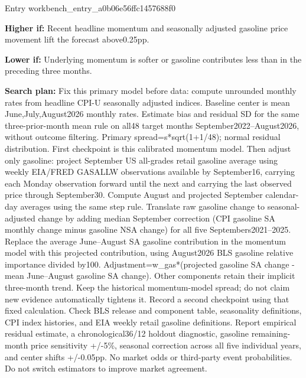 \documentclass[11pt]{article}
\begin{document}
Entry workbench\_en\hspace{0pt}try\_a0b06e56\hspace{0pt}ffc1457688f0


\par\noindent\textbf{Higher if:} Recent headline momentum and seasonally adjusted gasoline price movement lift the forecast above0.25pp.

\par\noindent\textbf{Lower if:} Underlying momentum is softer or gasoline contributes less than in the preceding three months.

\par\noindent\textbf{Search plan:} Fix this primary model before data: compute unrounded monthly rates from headline CPI-U seasonally adjusted indices. Baseline center is mean June,July,August2026 monthly rates. Estimate bias and residual SD for the same three-prior-month mean rule on all48 target months September2022–August2026, without outcome filtering. Primary spread=s*sqrt(1+1/48); normal residual distribution. First checkpoint is this calibrated momentum model. Then adjust only gasoline: project September US all-grades retail gasoline average using weekly EIA/FRED GASALLW observations available by September16, carrying each Monday observation forward until the next and carrying the last observed price through September30. Compute August and projected September calendar-day averages using the same step rule. Translate raw gasoline change to seasonal-adjusted change by adding median September correction (CPI gasoline SA monthly change minus gasoline NSA change) for all five Septembers2021–2025. Replace the average June–August SA gasoline contribution in the momentum model with this projected contribution, using August2026 BLS gasoline relative importance divided by100. Adjustment=w\_gas*(projected gasoline SA change - mean June–August gasoline SA change). Other components retain their implicit three-month trend. Keep the historical momentum-model spread; do not claim new evidence automatically tightens it. Record a second checkpoint using that fixed calculation. Check BLS release and component table, seasonality definitions, CPI index histories, and EIA weekly retail gasoline definitions. Report empirical residual estimate, a chronological36/12 holdout diagnostic, gasoline remaining-month price sensitivity +/-5\%, seasonal correction across all five individual years, and center shifts +/-0.05pp. No market odds or third-party event probabilities. Do not switch estimators to improve market agreement.
\end{document}
